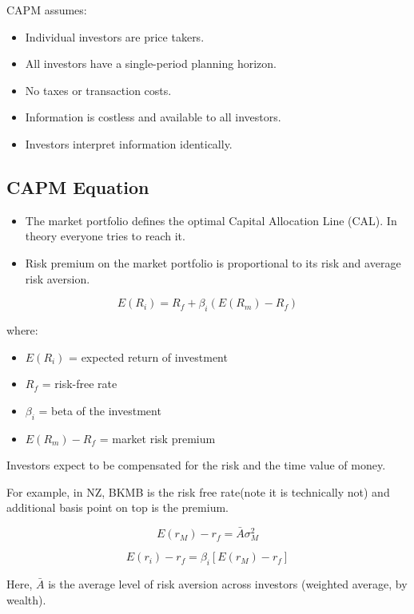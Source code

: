 \documentclass[
]{book}
\providecommand{\tightlist}{%
  \setlength{\itemsep}{0pt}\setlength{\parskip}{0pt}}
\begin{document}
CAPM assumes:

\begin{itemize}
\tightlist
\item
  Individual investors are price takers.
\item
  All investors have a single-period planning horizon.
\item
  No taxes or transaction costs.
\item
  Information is costless and available to all investors.
\item
  Investors interpret information identically.
\end{itemize}

\hypertarget{capm-equation}{%
\subsection{CAPM Equation}\label{capm-equation}}

\begin{itemize}
\item
  The market portfolio defines the optimal Capital Allocation Line
  (CAL). In theory everyone tries to reach it.
\item
  Risk premium on the market portfolio is proportional to its risk and
  average risk aversion.
\end{itemize}

\[
E(R_i) = R_f + \beta_i (E(R_m) - R_f)
\]

where:

\begin{itemize}
\tightlist
\item
  \(E(R_i)\) = expected return of investment
\item
  \(R_f\) = risk-free rate
\item
  \(\beta_i\) = beta of the investment
\item
  \(E(R_m) - R_f\) = market risk premium
\end{itemize}

Investors expect to be compensated for the risk and the time value of
money.

For example, in NZ, BKMB is the risk free rate(note it is technically
not) and additional basis point on top is the premium.

\[
E(r_M) - r_f = \bar{A} \sigma_M^2
\]

\[
E(r_i) - r_f = \beta_i [E(r_M) - r_f]
\]

Here, \(\bar{A}\) is the average level of risk aversion across investors
(weighted average, by wealth).
\end{document}
